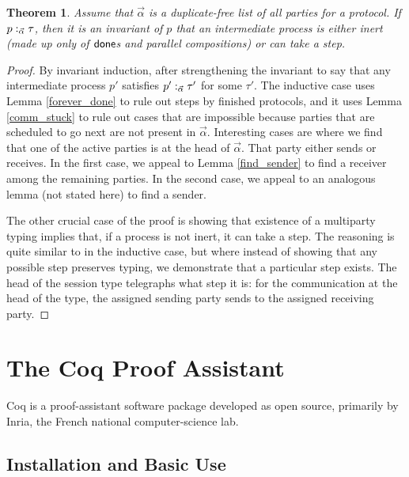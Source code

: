 \documentclass{amsbook}
\newtheorem{theorem}{Theorem}[chapter]
\theoremstyle{definition}
\theoremstyle{remark}
\numberwithin{section}{chapter}
\numberwithin{equation}{chapter}
\begin{document}
\begin{theorem}
  Assume that $\vec{\alpha}$ is a duplicate-free list of \emph{all} parties for a protocol.
  If $p :_{\vec{\alpha}} \tau$, then it is an invariant of $p$ that an intermediate process is either inert (made up only of $\mathsf{done}$s and parallel compositions) or can take a step.
\end{theorem}
\begin{proof}
  By invariant induction, after strengthening the invariant to say that any intermediate process $p'$ satisfies $p' :_{\vec{\alpha}} \tau'$ for some $\tau'$.
  The inductive case uses Lemma \ref{forever_done} to rule out steps by finished protocols, and it uses Lemma \ref{comm_stuck} to rule out cases that are impossible because parties that are scheduled to go next are not present in $\vec{\alpha}$.
  Interesting cases are where we find that one of the active parties is at the head of $\vec{\alpha}$.
  That party either sends or receives.
  In the first case, we appeal to Lemma \ref{find_sender} to find a receiver among the remaining parties.
  In the second case, we appeal to an analogous lemma (not stated here) to find a sender.

  The other crucial case of the proof is showing that existence of a multiparty typing implies that, if a process is not inert, it can take a step.
  The reasoning is quite similar to in the inductive case, but where instead of showing that any possible step preserves typing, we demonstrate that a particular step exists.
  The head of the session type telegraphs what step it is: for the communication at the head of the type, the assigned sending party sends to the assigned receiving party.
\end{proof}



\appendix


\chapter{\label{coqref}The Coq Proof Assistant}

Coq is a proof-assistant software package developed as open source, primarily by Inria, the French national computer-science lab.

\section{Installation and Basic Use}
\end{document}
